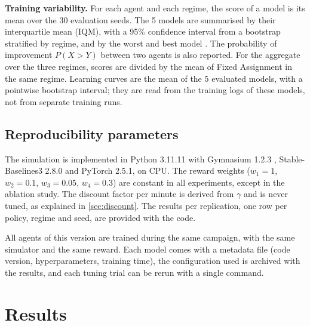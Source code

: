 \documentclass[11pt,a4paper]{article}
\newif\ifrevmarks
\newcommand{\revtag}[1]{\ifrevmarks\textsuperscript{\textcolor{red!70!black}{\scriptsize[#1]}}\fi}
\newcommand{\rev}[2]{\ifrevmarks{\color{revcolor}#2}\revtag{#1}\else#2\fi}
\newenvironment{revbloc}[1]{\par\ifrevmarks\color{revcolor}\noindent\revtag{#1}\ \fi}{\par}
\begin{document}
\begin{revbloc}{M3, M4, M5, M6, M7, M22, v3}
\textbf{Training variability.} For each agent and each regime, the score of a model is its mean over the 30 evaluation seeds. The 5 models are summarised by their interquartile mean (IQM), with a 95\% confidence interval from a bootstrap stratified by regime, and by the worst and best model \cite{Agarwal2021}. The probability of improvement $P(X > Y)$ between two agents is also reported. For the aggregate over the three regimes, scores are divided by the mean of Fixed Assignment in the same regime. Learning curves are the mean of the 5 evaluated models, with a pointwise bootstrap interval; they are read from the training logs of these models, not from separate training runs.
\end{revbloc}

\subsection{Reproducibility parameters}

\begin{revbloc}{M3, A}
The simulation is implemented in Python 3.11.11 with Gymnasium 1.2.3 \cite{MarkTowers2025}, Stable-Baselines3 2.8.0 \cite{AntoninRaffin2021} and PyTorch 2.5.1, on CPU. The reward weights ($w_1 = 1$, $w_2 = 0.1$, $w_3 = 0.05$, $w_4 = 0.3$) are constant in all experiments, except in the ablation study. \rev{v3}{The discount factor per minute is derived from $\gamma$ and is never tuned, as explained in \cref{sec:discount}.} The results per replication, one row per policy, regime and seed, are provided with the code.
\end{revbloc}

\rev{N11, v3}{All agents of this version are trained during the same campaign, with the same simulator and the same reward. Each model comes with a metadata file (code version, hyperparameters, training time), the configuration used is archived with the results, and each tuning trial can be rerun with a single command.}


\section{Results}
\label{sec:results}
\end{document}
